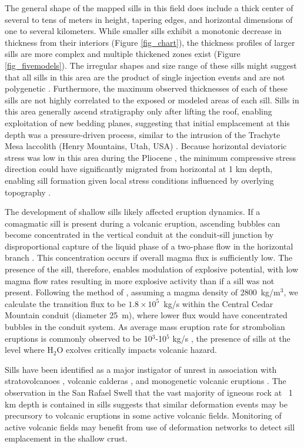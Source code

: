 The general shape of the mapped sills in this field does include a thick center of several to tens of meters in height, tapering edges, and horizontal dimensions of one to several kilometers. While smaller sills exhibit a monotonic decrease in thickness from their interiors (Figure \ref{fig_chart}), the thickness profiles of larger sills are more complex and multiple thickened zones exist (Figure \ref{fig_fivemodels}). The irregular shapes and size range of these sills might suggest that all sills in this area are the product of single injection events and are not polygenetic \citep{gudmundsson2012magma}. Furthermore, the maximum observed thicknesses of each of these sills are not highly correlated to the exposed or modeled areas of each sill. Sills in this area generally ascend stratigraphy only after lifting the roof, enabling exploitation of new bedding planes, suggesting that initial emplacement at this depth was a pressure-driven process, similar to the intrusion of the Trachyte Mesa laccolith (Henry Mountains, Utah, USA) \citep{wetmore2009geometry}. Because horizontal deviatoric stress was low in this area during the Pliocene \citep{delaney1986field}, the minimum compressive stress direction could have significantly migrated from horizontal at 1 km depth, enabling sill formation given local stress conditions influenced by overlying topography \citep{gudmundsson2012magma}.


The development of shallow sills likely affected eruption dynamics. If a comagmatic sill is present during a volcanic eruption, ascending bubbles can become concentrated in the vertical conduit at the conduit-sill junction by disproportional capture of the liquid phase of a two-phase flow in the horizontal branch \citep{conte2000experimental}. This concentration occurs if overall magma flux is sufficiently low. The presence of the sill, therefore, enables modulation of explosive potential, with low magma flow rates resulting in more explosive activity than if a sill was not present. Following the method of \citet{pioli2009controls}, assuming a magma density of 2800~kg/m$^3$, we calculate the transition flux to be $1.8\times 10^5$~kg/s within the Central Cedar Mountain conduit (diameter 25~m), where lower flux would have concentrated bubbles in the conduit system. As average mass eruption rate for strombolian eruptions is commonly observed to be 10$^3$-10$^5$ kg/s \citep{pioli2009controls}, the presence of sills at the level where H$_2$O exolves critically impacts volcanic hazard.

Sills have been identified as a major instigator of unrest in association with stratovolcanoes \citep[e.g.]{biggs2010stratovolcano,tarasewicz2012magma}, volcanic calderas \citep{macedonio2014sill}, and monogenetic volcanic eruptions \citep{erlund2010compositional}. The observation in the San Rafael Swell that the vast majority of igneous rock at ~1 km depth is contained in sills suggests that similar deformation events may be precursory to volcanic eruptions in some active volcanic fields. Monitoring of active volcanic fields may benefit from use of deformation networks to detect sill emplacement in the shallow crust.



